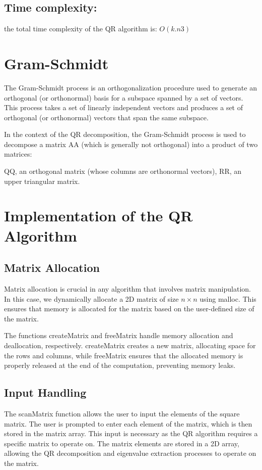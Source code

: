 \documentclass[journal]{IEEEtran}
\begin{document}
\subsection*{\textbf{Time complexity:}}
the total time complexity of the QR algorithm is:
$O(k . n3)$

\section{Gram-Schmidt}
The Gram-Schmidt process is an orthogonalization procedure used to generate an orthogonal (or orthonormal) basis for a subspace spanned by a set of vectors. This process takes a set of linearly independent vectors and produces a set of orthogonal (or orthonormal) vectors that span the same subspace.

In the context of the QR decomposition, the Gram-Schmidt process is used to decompose a matrix AA (which is generally not orthogonal) into a product of two matrices:

    QQ, an orthogonal matrix (whose columns are orthonormal vectors),
    RR, an upper triangular matrix.


\section{Implementation of the QR Algorithm}



\maketitle

\subsection*{Matrix Allocation}
Matrix allocation is crucial in any algorithm that involves matrix manipulation. In this case, we dynamically allocate a 2D matrix of size \( n \times n \) using malloc. This ensures that memory is allocated for the matrix based on the user-defined size of the matrix.

The functions createMatrix and freeMatrix handle memory allocation and deallocation, respectively. createMatrix creates a new matrix, allocating space for the rows and columns, while freeMatrix ensures that the allocated memory is properly released at the end of the computation, preventing memory leaks.

\subsection*{Input Handling}
The scanMatrix function allows the user to input the elements of the square matrix. The user is prompted to enter each element of the matrix, which is then stored in the matrix array. This input is necessary as the QR algorithm requires a specific matrix to operate on. The matrix elements are stored in a 2D array, allowing the QR decomposition and eigenvalue extraction processes to operate on the matrix.
\end{document}
